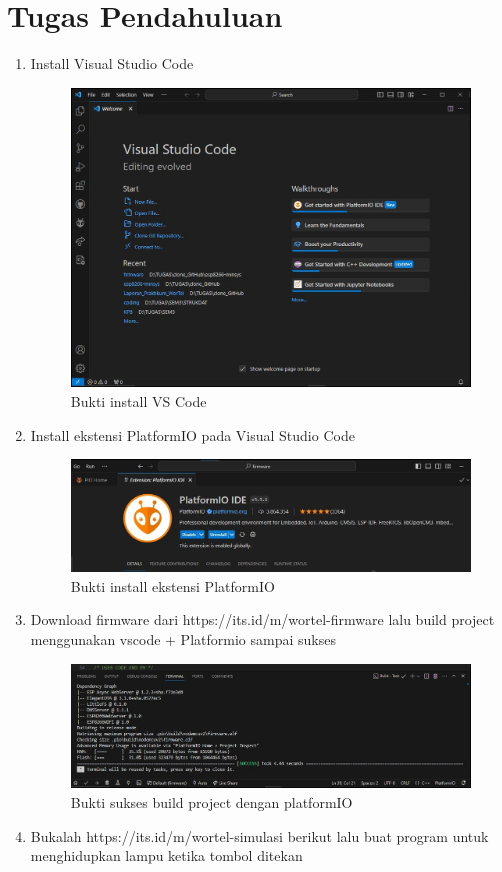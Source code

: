 \section*{Tugas Pendahuluan}
\begin{enumerate}
  \item Install Visual Studio Code
  \begin{figure}[H]
    \centering
    \includegraphics[width=0.6\linewidth]{img/modul_4/tupen_install_vscode.jpg}
    \caption{Bukti install VS Code} 
  \end{figure}
  \item Install ekstensi PlatformIO pada Visual Studio Code
  \begin{figure}[H]
    \centering
    \includegraphics[width=0.9\linewidth]{img/modul_4/tupen_install_platformIO.jpg}
    \caption{Bukti install ekstensi PlatformIO \label{fig:inisub1}}
  \end{figure}
  \item Download firmware dari https://its.id/m/wortel-firmware lalu build project menggunakan vscode + Platformio sampai sukses
  \begin{figure}[H]
    \centering
    \includegraphics[width=0.9\linewidth]{img/modul_4/tupen_build_platformIO.jpg}
    \caption{Bukti sukses build project dengan platformIO \label{fig:inisub1}}
  \end{figure}
  \item Bukalah https://its.id/m/wortel-simulasi berikut lalu buat program untuk menghidupkan lampu ketika tombol ditekan


\end{enumerate}
